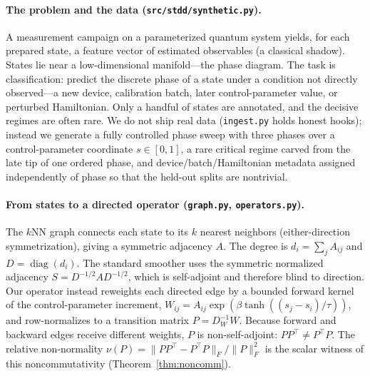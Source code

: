 \documentclass[aps,prresearch,reprint,amsmath,amssymb,nofootinbib,superscriptaddress,floatfix]{revtex4-2}
\theoremstyle{definition}
\theoremstyle{remark}
\theoremstyle{plain}
\begin{document}
\paragraph{The problem and the data (\texttt{src/stdd/synthetic.py}).}
A measurement campaign on a parameterized quantum system yields, for each prepared state, a feature vector
of estimated observables (a classical shadow). States lie near a low-dimensional manifold---the phase
diagram. The task is classification: predict the discrete phase of a state under a condition not directly
observed---a new device, calibration batch, later control-parameter value, or perturbed Hamiltonian. Only a
handful of states are annotated, and the decisive regimes are often rare. We do not ship real data
(\texttt{ingest.py} holds honest hooks); instead we generate a fully controlled phase sweep with three
phases over a control-parameter coordinate $s\in[0,1]$, a rare critical regime carved from the late tip of
one ordered phase, and device/batch/Hamiltonian metadata assigned independently of phase so that the
held-out splits are nontrivial.

\paragraph{From states to a directed operator (\texttt{graph.py}, \texttt{operators.py}).}
The $k$NN graph connects each state to its $k$ nearest neighbors (either-direction symmetrization), giving a
symmetric adjacency $A$. The degree is $d_i=\sum_jA_{ij}$ and $D=\operatorname{diag}(d_i)$. The standard
smoother uses the symmetric normalized adjacency $S=D^{-1/2}AD^{-1/2}$, which is self-adjoint and therefore
blind to direction. Our operator instead reweights each directed edge by a bounded forward kernel of the
control-parameter increment, $W_{ij}=A_{ij}\exp(\beta\tanh((s_j-s_i)/\tau))$, and row-normalizes to a
transition matrix $P=D_W^{-1}W$. Because forward and backward edges receive different weights, $P$ is
non-self-adjoint: $PP^\top\neq P^\top P$. The relative non-normality
$\nu(P)=\|PP^\top-P^\top P\|_F/\|P\|_F^2$ is the scalar witness of this noncommutativity
(Theorem~\ref{thm:noncomm}).
\end{document}

